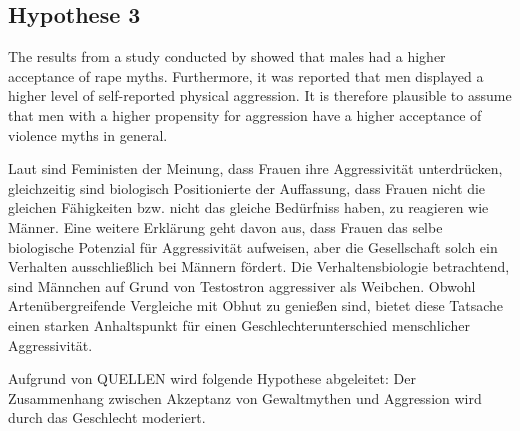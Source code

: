 \subsection{Hypothese 3}    \label{subsec_2.2.3}
The results from a study conducted by \textcite{H2_u_3_Bhogal_2016} showed that males had a higher acceptance of rape myths. Furthermore, it was reported that men displayed a higher level of self-reported physical aggression. It is therefore plausible to assume that men with a higher propensity for aggression have a higher acceptance of violence myths in general.

Laut \textcite{H3_MFUnterschied} sind Feministen der Meinung, dass Frauen ihre Aggressivität unterdrücken, gleichzeitig sind biologisch Positionierte der Auffassung, dass Frauen nicht die gleichen Fähigkeiten bzw. nicht das gleiche Bedürfniss haben, zu reagieren wie Männer. Eine weitere Erklärung geht davon aus, dass Frauen das selbe biologische Potenzial für Aggressivität aufweisen, aber die Gesellschaft solch ein Verhalten ausschließlich bei Männern fördert. Die Verhaltensbiologie betrachtend, sind Männchen auf Grund von Testostron aggressiver als Weibchen. Obwohl Artenübergreifende Vergleiche mit Obhut zu genießen sind, bietet diese Tatsache einen starken Anhaltspunkt für einen Geschlechterunterschied menschlicher Aggressivität.

Aufgrund von QUELLEN wird folgende Hypothese abgeleitet: Der Zusammenhang zwischen Akzeptanz von Gewaltmythen und Aggression wird durch das Geschlecht moderiert.

